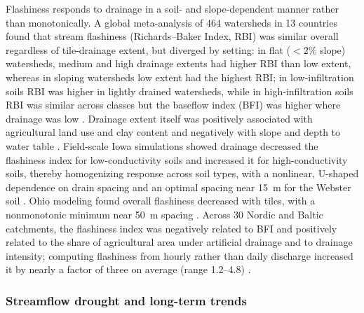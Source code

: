\documentclass[11pt]{article}
\begin{document}
Flashiness responds to drainage in a soil- and slope-dependent manner rather than monotonically. A global meta-analysis of 464 watersheds in 13 countries found that stream flashiness (Richards--Baker Index, RBI) was similar overall regardless of tile-drainage extent, but diverged by setting: in flat ($<2$\% slope) watersheds, medium and high drainage extents had higher RBI than low extent, whereas in sloping watersheds low extent had the highest RBI; in low-infiltration soils RBI was higher in lightly drained watersheds, while in high-infiltration soils RBI was similar across classes but the baseflow index (BFI) was higher where drainage was low \parencite{Zhou2025}. Drainage extent itself was positively associated with agricultural land use and clay content and negatively with slope and depth to water table \parencite{Zhou2025}. Field-scale Iowa simulations showed drainage decreased the flashiness index for low-conductivity soils and increased it for high-conductivity soils, thereby homogenizing response across soil types, with a nonlinear, U-shaped dependence on drain spacing and an optimal spacing near 15~m for the Webster soil \parencite{Sloan2016}. Ohio modeling found overall flashiness decreased with tiles, with a nonmonotonic minimum near 50~m spacing \parencite{Rathore2025}. Across 30 Nordic and Baltic catchments, the flashiness index was negatively related to BFI and positively related to the share of agricultural area under artificial drainage and to drainage intensity; computing flashiness from hourly rather than daily discharge increased it by nearly a factor of three on average (range 1.2--4.8) \parencite{Deelstra2014,Deelstra2014b}.

\subsubsection{Streamflow drought and long-term trends}
\end{document}
